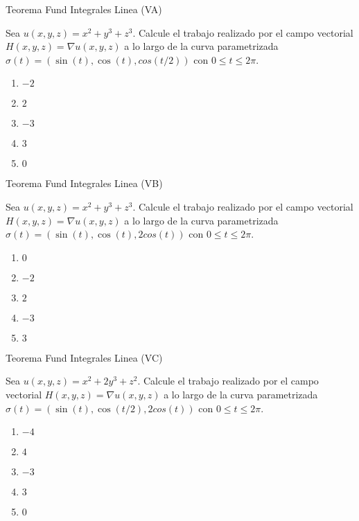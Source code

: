\documentclass[notheorems]{beamer}
\begin{document}

\begin{frame}{Teorema Fund Integrales Linea (VA)}

Sea $u(x,y,z)=x^2+y^3+z^3$. Calcule el trabajo realizado por el campo vectorial $H(x,y,z)=\nabla u(x,y,z)$ a lo largo de la curva parametrizada $\sigma(t)=\left(\sin(t), \cos(t), cos(t/2)\right)$ con $0\leq t\leq 2\pi$.

\begin{enumerate}
\item $-2$
\item $2$
\item $-3$
\item $3$
\item $0$
\end{enumerate}


\end{frame}

\begin{frame}{Teorema Fund Integrales Linea (VB)}

Sea $u(x,y,z)=x^2+y^3+z^3$. Calcule el trabajo realizado por el campo vectorial $H(x,y,z)=\nabla u(x,y,z)$ a lo largo de la curva parametrizada $\sigma(t)=\left(\sin(t), \cos(t), 2cos(t)\right)$ con $0\leq t\leq 2\pi$.

\begin{enumerate}
\item $0$
\item $-2$
\item $2$
\item $-3$
\item $3$
\end{enumerate}


\end{frame}

\begin{frame}{Teorema Fund Integrales Linea (VC)}

Sea $u(x,y,z)=x^2+2y^3+z^2$. Calcule el trabajo realizado por el campo vectorial $H(x,y,z)=\nabla u(x,y,z)$ a lo largo de la curva parametrizada $\sigma(t)=\left(\sin(t), \cos(t/2), 2cos(t)\right)$ con $0\leq t\leq 2\pi$.

\begin{enumerate}
\item $-4$
\item $4$
\item $-3$
\item $3$
\item $0$
\end{enumerate}

\end{frame}
\end{document}
